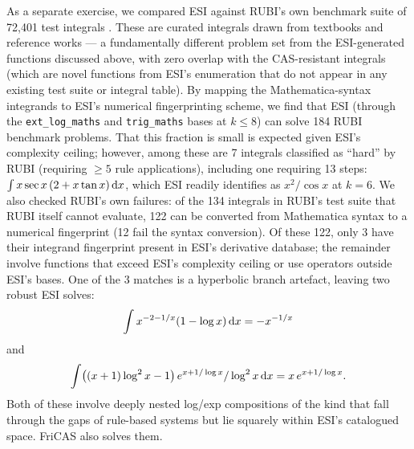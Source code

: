 \documentclass[preprint,12pt,authoryear]{elsarticle}
\newcommand{\dd}{{\rm d}}
\newcommand{\codexadd}[1]{{\color{purple}#1}}
\newcommand{\hd}[1]{{\color{red}\textbf{[HD: #1]}}}
\begin{document}
As a separate exercise, we compared ESI against RUBI's own benchmark suite of 72{,}401 test integrals \citep{Rubi2024}. These are curated integrals drawn from textbooks and reference works --- a fundamentally different problem set from the ESI-generated functions discussed above, with zero overlap with the CAS-resistant integrals (which are novel functions from ESI's enumeration that do not appear in any existing test suite or integral table). By mapping the Mathematica-syntax integrands to ESI's numerical fingerprinting scheme, we find that ESI (through the \texttt{ext\_log\_maths} and \texttt{trig\_maths} bases at $k \leq 8$) can solve 184 RUBI benchmark problems. That this fraction is small is expected given ESI's complexity ceiling; however, among these are 7 integrals classified as ``hard'' by RUBI (requiring $\geq 5$ rule applications), including one requiring 13 steps: $\int x \sec x\,(2 + x \tan x)\,\dd x$, which ESI readily identifies as $x^2/\cos x$ at $k = 6$. \codexadd{We also checked RUBI's own failures: of the 134 integrals in RUBI's test suite that RUBI itself cannot evaluate, 122 can be converted from Mathematica syntax to a numerical fingerprint (12 fail the syntax conversion). Of these 122, only 3 have their integrand fingerprint present in ESI's derivative database; the remainder involve functions that exceed ESI's complexity ceiling or use operators outside ESI's bases. One of the 3 matches is a hyperbolic branch artefact, leaving two robust ESI solves:}
\begin{equation}
	\int x^{-2 - 1/x}(1 - \log x)\,\dd x = -x^{-1/x} \nonumber
\end{equation}
and
\begin{equation}
	\int \bigl((x+1)\log^2 x - 1\bigr)\,e^{x + 1/\log x}/\log^2 x\,\dd x = x\,e^{x+1/\log x}. \nonumber
\end{equation}
Both of these involve deeply nested log/exp compositions of the kind that fall through the gaps of rule-based systems but lie squarely within ESI's catalogued space. FriCAS also solves them.
\end{document}
